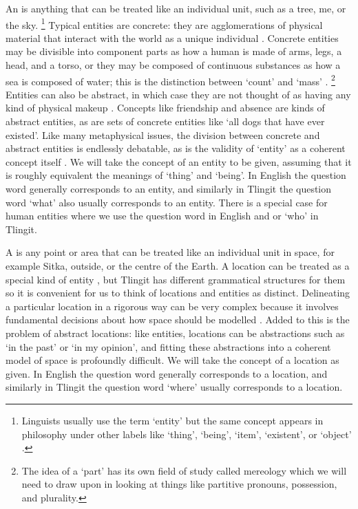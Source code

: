An  is anything that can be treated like an individual unit, such as a tree, me, or the sky.%
\footnote{Linguists usually use the term ‘entity’ but the same concept appears in philosophy under other labels like ‘thing’, ‘being’, ‘item’, ‘existent’, or ‘object’ \parencite{rettler-bailey:2017}.}
Typical entities are concrete: they are agglomerations of physical material that interact with the world as a unique individual \parencite{rettler-bailey:2017}.
Concrete entities may be divisible into component parts as how a human is made of arms, legs, a head, and a torso, or they may be composed of continuous substances as how a sea is composed of water; this is the distinction between ‘count’ and ‘mass’ \parencites{steen:2016}{nicolas:2018}.%
\footnote{The idea of a ‘part’ has its own field of study called mereology \parencite{varzi:2019} which we will need to draw upon in looking at things like partitive pronouns, possession, and plurality.}
Entities can also be abstract, in which case they are not thought of as having any kind of physical makeup \parencite{rosen:2020}.
Concepts like friendship and absence are kinds of abstract entities, as are sets of concrete entities like ‘all dogs that have ever existed’.
Like many metaphysical issues, the division between concrete and abstract entities is endlessly debatable, as is the validity of ‘entity’ as a coherent concept itself \parencites{casati:2004}{rettler-bailey:2017}{rosen:2020}.
We will take the concept of an entity to be given, assuming that it is roughly equivalent the meanings of ‘thing’ and ‘being’.
In English the question word  generally corresponds to an entity, and similarly in Tlingit the question word  ‘what’ also usually corresponds to an entity.
There is a special case for human entities where we use the question word  in English and  or  ‘who’ in Tlingit.

A  is any point or area that can be treated like an individual unit in space, for example Sitka, outside, or the centre of the Earth.
A location can be treated as a special kind of entity \parencite{gilmore:2018}, but Tlingit has different grammatical structures for them so it is convenient for us to think of locations and entities as distinct.
Delineating a particular location in a rigorous way can be very complex because it involves fundamental decisions about how space should be modelled \parencites{pederson:2012}{landau:2012}{gilmore:2018}.
Added to this is the problem of abstract locations: like entities, locations can be abstractions such as ‘in the past’ or ‘in my opinion’, and fitting these abstractions into a coherent model of space is profoundly difficult.
We will take the concept of a location as given.
In English the question word  generally corresponds to a location, and similarly in Tlingit the question word  ‘where’ usually corresponds to a location.

